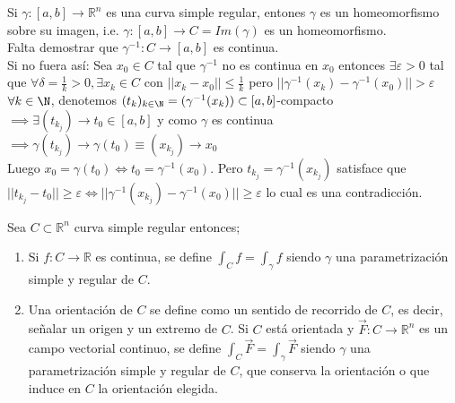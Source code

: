 
\begin{observación}
Si $\gamma: [a,b] \to \mathbb{R}^n$ es una curva simple regular, entones $\gamma$ es un homeomorfismo sobre su imagen, i.e. $\gamma: [a, b] \to C = Im(\gamma)$ es un homeomorfismo. \\
Falta demostrar que $\gamma^{-1}: C \to [a,b]$ es continua.\\
Si no fuera así: Sea $x_0 \in C$ tal que $\gamma^{-1}$ no es continua en $x_0$ entonces $\exists \varepsilon > 0$ tal que $\forall \delta = \frac{1}{k} > 0, \exists x_k \in C$ con $ ||x_k - x_0|| \leq \frac{1}{k}$ pero $||\gamma^{-1}(x_k) - \gamma^{-1}(x_0)|| > \varepsilon$ \\
$\forall k \in \N$, denotemos $(t_k)_{k \in \N} = (\gamma^{-1}(x_k)) \subset [a,b]$-compacto $\implies \exists (t_{k_j}) \to t_0 \in [a,b]$ y como $\gamma$ es continua $\implies \gamma(t_{k_j}) \to \gamma(t_0) \equiv (x_{k_j}) \to x_0$ \\
Luego $x_0 = \gamma(t_0) \iff t_0 = \gamma^{-1}(x_0)$. Pero $t_{k_j} = \gamma^{-1}(x_{k_j})$ satisface que $||t_{k_j} - t_0|| \geq \varepsilon \iff ||\gamma^{-1}(x_{k_j}) - \gamma^{-1}(x_0)|| \geq \varepsilon$ lo cual es una contradicción.
\end{observación}

\begin{definición} 
Sea $C \subset \mathbb{R}^n$ curva simple regular entonces;
\begin{enumerate}
    \item Si $f: C \to \mathbb{R}$ es continua, se define $\int_{C} f = \int_{\gamma} f$
          siendo $\gamma$ una parametrización simple y regular de $C$.
    \item Una orientación de $C$ se define como un sentido de recorrido de $C$, es decir,
          señalar un origen y un extremo de $C$. Si $C$ está orientada y $\vec{F}: C \to
              \mathbb{R}^n$ es un campo vectorial continuo, se define $\int_{C} \vec{F} =
              \int_{\gamma} \vec{F}$ siendo $\gamma$ una parametrización simple y regular de
          $C$, que conserva la orientación o que induce en $C$ la orientación elegida.
\end{enumerate}
\end{definición}

